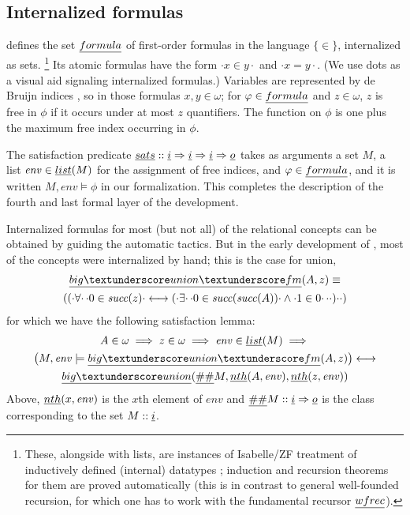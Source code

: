 \subsection{Internalized formulas}
\label{sec:internalized-formulas}

 defines the set $\formula$ of first-order 
formulas in the language $\{ \in \}$, internalized as sets.%
\footnote{These, alongside with lists, are instances of
Isabelle/ZF treatment of inductively defined (internal) datatypes \cite[Sect.~4]{Paulson1995-wz};
induction and recursion theorems for them are proved automatically
(this is in contrast to general well-founded recursion, for which
one has to work with the fundamental recursor $\isa{wfrec}$).}  Its
atomic formulas have the form $\cdot x \in y\cdot$ and $\cdot x =
y\cdot$. (We use dots as a visual aid signaling internalized formulas.)
Variables are represented by de Bruijn indices \cite{MR0321704}, so in
those formulas $x,y \in \omega$; for $\phi\in\formula$ and
$z\in\omega$, $z$ is free in $\phi$ if it occurs under at most $z$
quantifiers. The  function on $\phi$ is one plus the
maximum free index occurring in $\phi$.

The satisfaction predicate
$\isa{sats}::\tyi\fun\tyi\fun\tyi\fun\tyo$ takes as arguments a set
$M$, a list $\mathit{env}\in\isa{list}(M)$ for the assignment of
free indices, and $\phi\in\formula$, and it is written
$M,\mathit{env}\models\phi$ in our formalization.
This completes the
description of the fourth and last formal layer of the development.

Internalized formulas for most (but not all) of the relational
concepts can be obtained by guiding the automatic tactics. But in the
early development of 
, most of the concepts were internalized by
hand; this is the case for union,
\begin{multline*}
  \isa{big{\uscore}union{\uscore}fm}(A,z) \equiv \\
  (({\cdot}\forall{\cdot}\,{\cdot}0 \in \mathit{succ}(z){\cdot} \longleftrightarrow
  ({\cdot}\exists{\cdot}\,{\cdot}0 \in \mathit{succ}(\mathit{succ}(A)){\cdot} \land {\cdot}1 \in
  0{\cdot}\,{\cdot}{\cdot}){\cdot}{\cdot})
\end{multline*}
for which we have the following satisfaction lemma:
\begin{multline}\label{eq:sats_big_union_fm}
  A \in \omega \implies z \in \omega \implies \mathit{env} \in \isa{list}(M)
  \implies \\
  \bigl(M, \mathit{env} \models \isa{big{\uscore}union{\uscore}fm}(A,z)\bigr)%
  \longleftrightarrow \\
  \isa{big{\uscore}union}(\isa{\#\#} M, \isa{nth}(A,
  \mathit{env}), \isa{nth}(z, \mathit{env}))
\end{multline}
Above, $\isa{nth}(x,\mathit{env})$ is the $x$th element of $\mathit{env}$
and $\isa{\#\#}M::\tyi\fun \tyo$ is the class corresponding to the
set $M::\tyi$.

